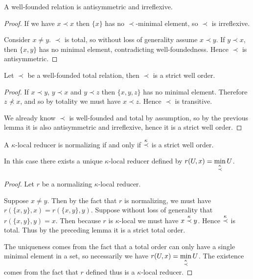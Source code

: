 \begin{lemma}
A well-founded relation is antisymmetric and irreflexive.
\end{lemma}

\begin{proof}
If we have \(x \prec x\) then \(\{x\}\) has no \(\prec\)-minimal element,
so \(\prec\) is irreflexive.

Consider \(x \neq y\).
\(\prec\) is total,
so without loss of generality assume \(x \prec y\).
If \(y \prec x\),
then \(\{x, y\}\) has no minimal element,
contradicting well-foundedness.
Hence \(\prec\) is antisymmetric.
\end{proof}

\begin{lemma}
Let \(\prec\) be a well-founded total relation,
then \(\prec\) is a strict well order.
\end{lemma}

\begin{proof}
If \(x \prec y\),
\(y \prec x\)
and \(y \prec z\) then \(\{x, y, z\}\) has no minimal element.
Therefore \(z \not\prec x\),
and so by totality we must have \(x \prec z\).
Hence \(\prec\) is transitive.

We already know \(\prec\) is well-founded and total by assumption,
so by the previous lemma it is also antisymmetric and irreflexive,
hence it is a strict well order.
\end{proof}

\begin{theorem}
A \(\kappa\)-local reducer is normalizing if and only if \(\stackrel{\kappa}{\prec}\) is a strict well order.

In this case there exists a unique \(\kappa\)-local reducer defined by \(r(U, x) = \min\limits_{\stackrel{\kappa}{\prec}} U\).
\end{theorem}

\begin{proof}
Let \(r\) be a normalizing \(\kappa\)-local reducer.

Suppose \(x \neq y\).
Then by the fact that \(r\) is normalizing,
we must have \(r(\{x, y\}, x) = r(\{x, y\}, y)\).
Suppose without loss of generality that \(r(\{x, y\}, y) = x\).
Then because \(r\) is \(\kappa\)-local we must have \(x \stackrel{\kappa}{\prec} y\).
Hence \(\stackrel{\kappa}{\prec}\) is total.
Thus by the preceding lemma it is a strict total order.

The uniqueness comes from the fact that a total order can only have a single minimal element in a set,
so necessarily we have \(r(U, x) = \min\limits_{\stackrel{\kappa}{\prec}} U\).
The existence comes from the fact that \(r\) defined thus is a \(\kappa\)-local reducer.
\end{proof}

